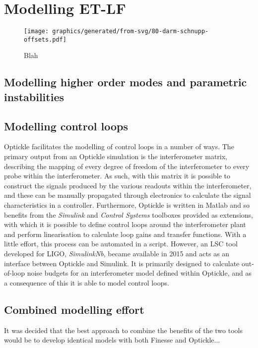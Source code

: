 \section{Modelling ET-LF}

\begin{figure}
  \centering
  \texttt{[image: graphics/generated/from-svg/80-darm-schnupp-offsets.pdf]}
  \caption[Differential arm and Schnupp offsets in a \DRFPMI{}]{\label{fig:darm-schnupp-offsets}Blah}
\end{figure}

\subsection{Modelling higher order modes and parametric instabilities}

\subsection{Modelling control loops}
Optickle facilitates the modelling of control loops in a number of ways. The primary output from an Optickle simulation is the interferometer matrix, describing the mapping of every degree of freedom of the interferometer to every probe within the interferometer. As such, with this matrix it is possible to construct the signals produced by the various readouts within the interferometer, and these can be manually propagated through electronics to calculate the signal characteristics in a controller. Furthermore, Optickle is written in Matlab and so benefits from the \emph{Simulink} and \emph{Control Systems} toolboxes provided as extensions, with which it is possible to define control loops around the interferometer plant and perform linearisation to calculate loop gains and transfer functions. With a little effort, this process can be automated in a script. However, an \gls{LSC} tool developed for \gls{LIGO}, \emph{SimulinkNb}, became available in 2015 and acts as an interface between Optickle and Simulink. It is primarily designed to calculate out-of-loop noise budgets for an interferometer model defined within Optickle, and as a consequence of this it is able to model control loops.

\subsection{Combined modelling effort}
It was decided that the best approach to combine the benefits of the two tools would be to develop identical models with both Finesse and Optickle...

